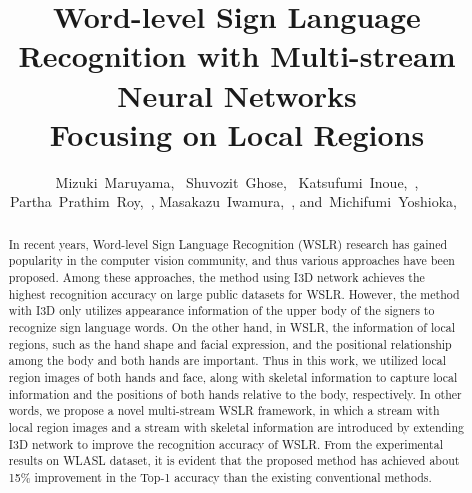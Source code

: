 \documentclass[journal]{IEEEtran}
\begin{document}
\title{Word-level Sign Language Recognition with Multi-stream Neural Networks\\ Focusing on Local Regions}




\author{Mizuki~Maruyama,~\IEEEmembership{}
        Shuvozit~Ghose,~\IEEEmembership{}
        Katsufumi~Inoue,~,
        Partha~Prathim~Roy,~,
        Masakazu~Iwamura,~,
        and~Michifumi~Yoshioka,~\IEEEmembership{}}
        





















\maketitle

\begin{abstract}
In recent years, Word-level Sign Language Recognition (WSLR) research has gained popularity in the computer vision community, and thus various approaches have been proposed. Among these approaches, the method using I3D network achieves the highest recognition accuracy on large public datasets for WSLR. However, the method with I3D only utilizes appearance information of the upper body of the signers to recognize sign language words. On the other hand, in WSLR, the information of local regions, such as the hand shape and facial expression, and the positional relationship among the body and both hands are important. Thus in this work, we utilized local region images of both hands and face, along with skeletal information to capture local information and the positions of both hands relative to the body, respectively. In other words, we propose a novel multi-stream WSLR framework, in which a stream with local region images and a stream with skeletal information are introduced by extending I3D network to improve the recognition accuracy of WSLR. From the experimental results on WLASL dataset, it is evident that the proposed method has achieved about 15\% improvement in the Top-1 accuracy than the existing conventional methods.

\end{abstract}
\end{document}
